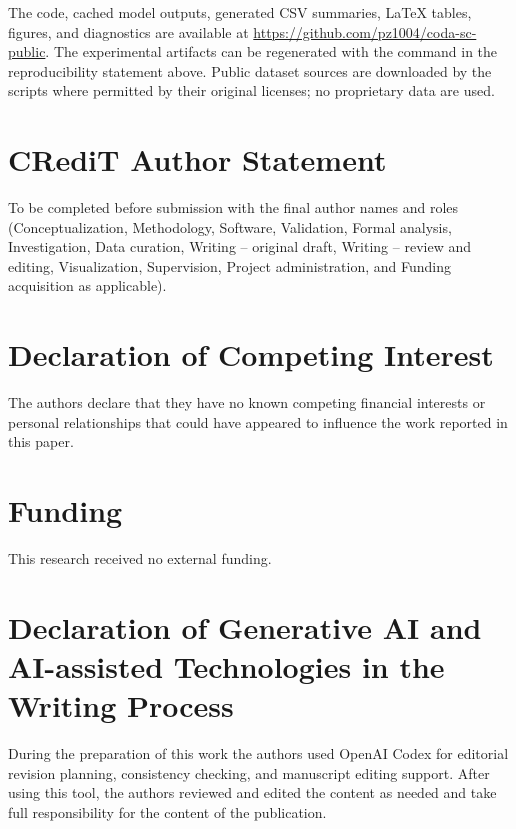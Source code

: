 \documentclass[11pt]{article}
\begin{document}
The code, cached model outputs, generated CSV summaries, LaTeX tables, figures,
and diagnostics are available at
\url{https://github.com/pz1004/coda-sc-public}. The experimental artifacts can
be regenerated with the command in the reproducibility statement above. Public
dataset sources are downloaded by the scripts where permitted by their original
licenses; no proprietary data are used.

\section*{CRediT Author Statement}

To be completed before submission with the final author names and roles
(Conceptualization, Methodology, Software, Validation, Formal analysis,
Investigation, Data curation, Writing -- original draft, Writing -- review and
editing, Visualization, Supervision, Project administration, and Funding
acquisition as applicable).

\section*{Declaration of Competing Interest}

The authors declare that they have no known competing financial interests or
personal relationships that could have appeared to influence the work reported
in this paper.

\section*{Funding}

This research received no external funding.

\section*{Declaration of Generative AI and AI-assisted Technologies in the Writing Process}

During the preparation of this work the authors used OpenAI Codex for editorial
revision planning, consistency checking, and manuscript editing support. After
using this tool, the authors reviewed and edited the content as needed and take
full responsibility for the content of the publication.



\end{document}
